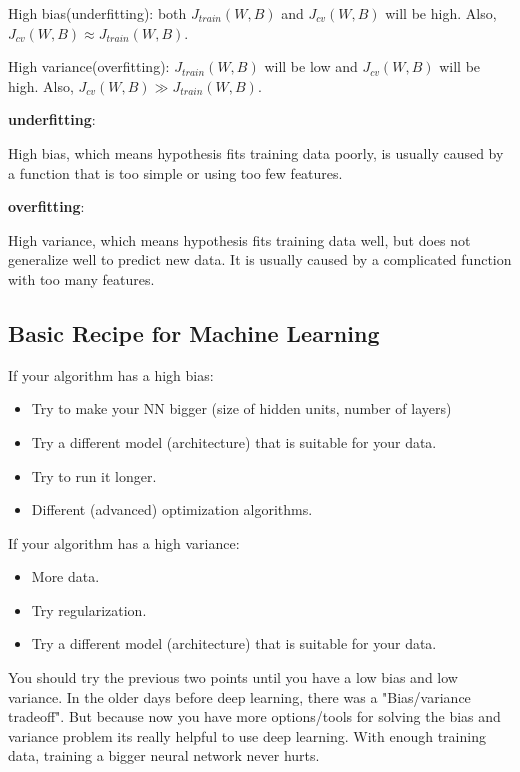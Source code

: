 \documentclass{article}
\begin{document}
\noindent High bias(underfitting): both \(J_{train}(W, B)\) and \(J_{cv}(W, B)\) will be high. Also, \(J_{cv}(W, B) \approx J_{train}(W, B)\). 

\noindent High variance(overfitting): \(J_{train}(W, B)\) will be low and \(J_{cv}(W, B)\) will be high. Also, \(J_{cv}(W, B) \gg J_{train}(W, B)\). 

\bigskip

\noindent \textbf{underfitting}:

\noindent High bias, which means hypothesis fits training data poorly, is usually caused by a function that is too simple or using too few features. 

\bigskip

\noindent \textbf{overfitting}:

\noindent High variance, which means hypothesis fits training data well, but does not generalize well to predict new data. It is usually caused by a complicated function with too many features.

\subsection{Basic Recipe for Machine Learning}

\noindent If your algorithm has a high bias:

\begin{itemize}
  \item Try to make your NN bigger (size of hidden units, number of layers)
  \item Try a different model (architecture) that is suitable for your data.
  \item Try to run it longer.
  \item Different (advanced) optimization algorithms.
\end{itemize}

\noindent If your algorithm has a high variance:

\begin{itemize}
  \item More data.
  \item Try regularization.
  \item Try a different model (architecture) that is suitable for your data.
\end{itemize}

\noindent You should try the previous two points until you have a low bias and low variance. In the older days before deep learning, there was a "Bias/variance tradeoff". But because now you have more options/tools for solving the bias and variance problem its really helpful to use deep learning. With enough training data, training a bigger neural network never hurts.
\end{document}
